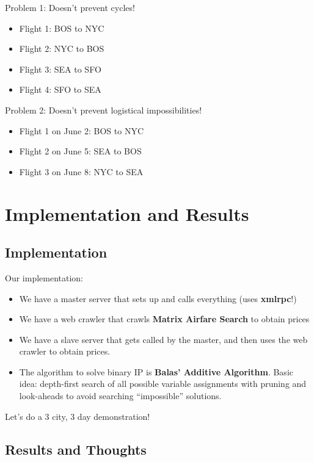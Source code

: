\documentclass[10pt, xcolor=svgnames]{beamer}
\begin{document}
\begin{frame}
Problem 1: Doesn't prevent cycles!
\begin{itemize}
    \item Flight 1: BOS to NYC
    \item Flight 2: NYC to BOS 
    \item Flight 3: SEA to SFO 
    \item Flight 4: SFO to SEA
\end{itemize}
\pause
Problem 2: Doesn't prevent logistical impossibilities!
\begin{itemize}
    \item Flight 1 on June 2: BOS to NYC
    \item Flight 2 on June 5: SEA to BOS
    \item Flight 3 on June 8: NYC to SEA
\end{itemize}
\end{frame}


\section{Implementation and Results}

\subsection{Implementation}

\begin{frame}
Our implementation:

\begin{itemize}
    \item We have a master server that sets up and calls everything (uses \textbf{xmlrpc}!)
    \item We have a web crawler that crawls \textbf{Matrix Airfare Search} to obtain prices
    \item We have a slave server that gets called by the master, and then uses the web crawler to obtain prices.
    \item The algorithm to solve binary IP is \textbf{Balas' Additive Algorithm}. Basic idea: depth-first search of all possible variable assignments
with pruning and look-aheads to avoid searching ``impossible'' solutions.
\end{itemize}
Let's do a 3 city, 3 day demonstration!
\end{frame}

\subsection{Results and Thoughts}
\end{document}
